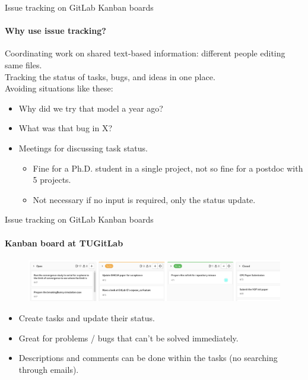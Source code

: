 \documentclass[
	aspectratio=169,%
	color={accentcolor=2d},
	logo=true,%
	colorframetitle=true,%
	]{tudabeamer}
\begin{document}
\begin{frame}{Issue tracking on GitLab Kanban boards} 
    \framesubtitle{Why use issue tracking?}
    \vfill

    Coordinating work on shared text-based information: different people editing same files.\\ 
    Tracking the status of tasks, bugs, and ideas in one place.\\
    Avoiding situations like these:
    \begin{itemize}  
        \item Why did we try that model a year ago?
        \item What was that bug in X?
        \item Meetings for discussing task status. 
            \begin{itemize}
                \item Fine for a Ph.D. student in a single project, not so fine for a postdoc with 5 projects. 
                \item Not necessary if no input is required, only the status update. 
            \end{itemize}
    \end{itemize}

\end{frame}

\begin{frame}{Issue tracking on GitLab Kanban boards} 
    \framesubtitle{Kanban board at TUGitLab}
    \vfill

    \begin{figure}
        \includegraphics[width=\textwidth]{figures/kanban-board-gitlab.png}
    \end{figure}

    \begin{itemize}
        \item Create tasks and update their status.  
        \item Great for problems / bugs that can't be solved immediately. 
        \item Descriptions and comments can be done within the tasks (no searching through emails).  
    \end{itemize}

\end{frame}
\end{document}

